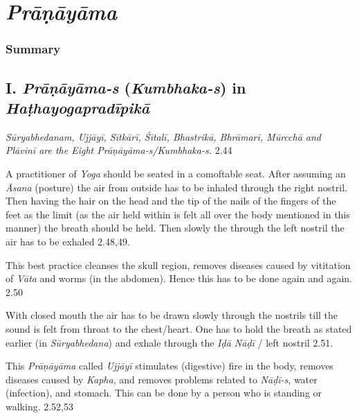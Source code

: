 \chapter{\textit{Prāṇāyāma}}

\subsection*{Summary}

\section*{I. \textit{Prāṇāyāma-s} (\textit{Kumbhaka-s}) in \textit{Haṭhayogapradī\-pikā}}

\textit{Sūryabhedanam, Ujjāyī, Sītkārī, Śītalī, Bhastrikā, Bhrāmarī, Mūrcchā and Plāvinī are the Eight Prāṇāyāma-s/Kumbhaka-s.} 2.44


A practitioner of \textit{Yoga} should be seated in a comoftable seat. After assuming an \textit{Āsana} (posture) the air from outside has to be inhaled through the right nostril.  Then having the hair on the head and the tip of the nails of the fingers of the feet as the limit (as the air held within is felt all over the body mentioned in this manner) the breath should be held. Then slowly the through the left nostril the air has to be exhaled 2.48,49.


This best practice cleanses the skull region, removes diseases caused by vititation of \textit{Vāta} and worms (in the abdomen). Hence this has to be done again and again. 2.50


With closed mouth the air has to be drawn slowly through the nostrils till the sound is felt from throat to the chest/heart. One has to hold the breath as stated earlier (in \textit{Sūryabhedana}) and exhale through the \textit{Iḍā Nāḍī} / left nostril 2.51.


This \textit{Prāṇāyāma} called \textit{Ujjāyī} stimulates (digestive) fire in the body, removes diseases caused by \textit{Kapha}, and removes problems related to \textit{Nāḍī-s}, water (infection), and stomach. This can be done by a person who is standing or walking.  2.52,53

